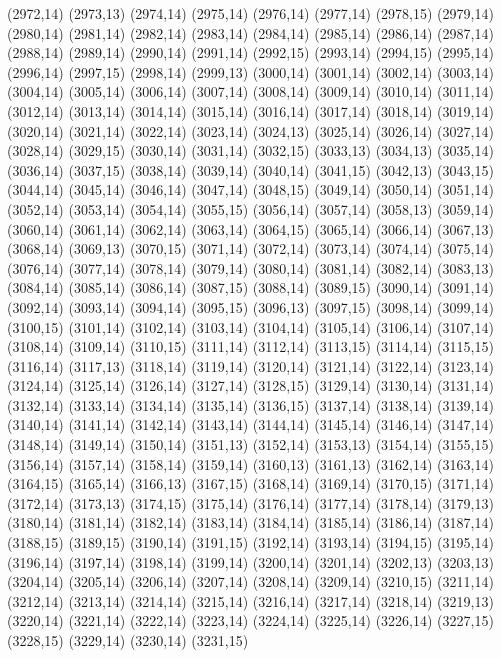(2972,14)
(2973,13)
(2974,14)
(2975,14)
(2976,14)
(2977,14)
(2978,15)
(2979,14)
(2980,14)
(2981,14)
(2982,14)
(2983,14)
(2984,14)
(2985,14)
(2986,14)
(2987,14)
(2988,14)
(2989,14)
(2990,14)
(2991,14)
(2992,15)
(2993,14)
(2994,15)
(2995,14)
(2996,14)
(2997,15)
(2998,14)
(2999,13)
(3000,14)
(3001,14)
(3002,14)
(3003,14)
(3004,14)
(3005,14)
(3006,14)
(3007,14)
(3008,14)
(3009,14)
(3010,14)
(3011,14)
(3012,14)
(3013,14)
(3014,14)
(3015,14)
(3016,14)
(3017,14)
(3018,14)
(3019,14)
(3020,14)
(3021,14)
(3022,14)
(3023,14)
(3024,13)
(3025,14)
(3026,14)
(3027,14)
(3028,14)
(3029,15)
(3030,14)
(3031,14)
(3032,15)
(3033,13)
(3034,13)
(3035,14)
(3036,14)
(3037,15)
(3038,14)
(3039,14)
(3040,14)
(3041,15)
(3042,13)
(3043,15)
(3044,14)
(3045,14)
(3046,14)
(3047,14)
(3048,15)
(3049,14)
(3050,14)
(3051,14)
(3052,14)
(3053,14)
(3054,14)
(3055,15)
(3056,14)
(3057,14)
(3058,13)
(3059,14)
(3060,14)
(3061,14)
(3062,14)
(3063,14)
(3064,15)
(3065,14)
(3066,14)
(3067,13)
(3068,14)
(3069,13)
(3070,15)
(3071,14)
(3072,14)
(3073,14)
(3074,14)
(3075,14)
(3076,14)
(3077,14)
(3078,14)
(3079,14)
(3080,14)
(3081,14)
(3082,14)
(3083,13)
(3084,14)
(3085,14)
(3086,14)
(3087,15)
(3088,14)
(3089,15)
(3090,14)
(3091,14)
(3092,14)
(3093,14)
(3094,14)
(3095,15)
(3096,13)
(3097,15)
(3098,14)
(3099,14)
(3100,15)
(3101,14)
(3102,14)
(3103,14)
(3104,14)
(3105,14)
(3106,14)
(3107,14)
(3108,14)
(3109,14)
(3110,15)
(3111,14)
(3112,14)
(3113,15)
(3114,14)
(3115,15)
(3116,14)
(3117,13)
(3118,14)
(3119,14)
(3120,14)
(3121,14)
(3122,14)
(3123,14)
(3124,14)
(3125,14)
(3126,14)
(3127,14)
(3128,15)
(3129,14)
(3130,14)
(3131,14)
(3132,14)
(3133,14)
(3134,14)
(3135,14)
(3136,15)
(3137,14)
(3138,14)
(3139,14)
(3140,14)
(3141,14)
(3142,14)
(3143,14)
(3144,14)
(3145,14)
(3146,14)
(3147,14)
(3148,14)
(3149,14)
(3150,14)
(3151,13)
(3152,14)
(3153,13)
(3154,14)
(3155,15)
(3156,14)
(3157,14)
(3158,14)
(3159,14)
(3160,13)
(3161,13)
(3162,14)
(3163,14)
(3164,15)
(3165,14)
(3166,13)
(3167,15)
(3168,14)
(3169,14)
(3170,15)
(3171,14)
(3172,14)
(3173,13)
(3174,15)
(3175,14)
(3176,14)
(3177,14)
(3178,14)
(3179,13)
(3180,14)
(3181,14)
(3182,14)
(3183,14)
(3184,14)
(3185,14)
(3186,14)
(3187,14)
(3188,15)
(3189,15)
(3190,14)
(3191,15)
(3192,14)
(3193,14)
(3194,15)
(3195,14)
(3196,14)
(3197,14)
(3198,14)
(3199,14)
(3200,14)
(3201,14)
(3202,13)
(3203,13)
(3204,14)
(3205,14)
(3206,14)
(3207,14)
(3208,14)
(3209,14)
(3210,15)
(3211,14)
(3212,14)
(3213,14)
(3214,14)
(3215,14)
(3216,14)
(3217,14)
(3218,14)
(3219,13)
(3220,14)
(3221,14)
(3222,14)
(3223,14)
(3224,14)
(3225,14)
(3226,14)
(3227,15)
(3228,15)
(3229,14)
(3230,14)
(3231,15)
